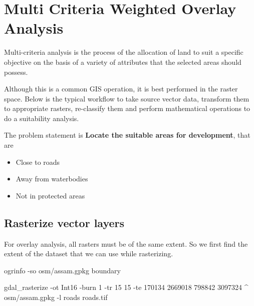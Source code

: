 \documentclass[12pt,a4paper]{article}
\newenvironment{Shaded}{\begin{snugshade}}{\end{snugshade}}
\newcommand{\ExtensionTok}[1]{#1}
\newcommand{\NormalTok}[1]{#1}
\providecommand{\tightlist}{%
  \setlength{\itemsep}{0pt}\setlength{\parskip}{0pt}}
\begin{document}
\hypertarget{multi-criteria-weighted-overlay-analysis}{%
\section{Multi Criteria Weighted Overlay
Analysis}\label{multi-criteria-weighted-overlay-analysis}}

Multi-criteria analysis is the process of the allocation of land to suit
a specific objective on the basis of a variety of attributes that the
selected areas should possess.

Although this is a common GIS operation, it is best performed in the
raster space. Below is the typical workflow to take source vector data,
transform them to appropriate rasters, re-classify them and perform
mathematical operations to do a suitability analysis.

The problem statement is \textbf{Locate the suitable areas for
development}, that are

\begin{itemize}
\tightlist
\item
  Close to roads
\item
  Away from waterbodies
\item
  Not in protected areas
\end{itemize}

\hypertarget{rasterize-vector-layers}{%
\subsection{Rasterize vector layers}\label{rasterize-vector-layers}}

For overlay analysis, all rasters must be of the same extent. So we
first find the extent of the dataset that we can use while rasterizing.

\begin{Shaded}
\begin{Highlighting}[]
\ExtensionTok{ogrinfo}\NormalTok{ -so osm/assam.gpkg boundary}
\end{Highlighting}
\end{Shaded}

\begin{Shaded}
\begin{Highlighting}[]
\ExtensionTok{gdal_rasterize}\NormalTok{ -ot Int16 -burn 1 -tr 15 15 -te 170134 2669018 798842 3097324 ^}
  \ExtensionTok{osm/assam.gpkg}\NormalTok{ -l roads roads.tif}
\end{Highlighting}
\end{Shaded}
\end{document}
